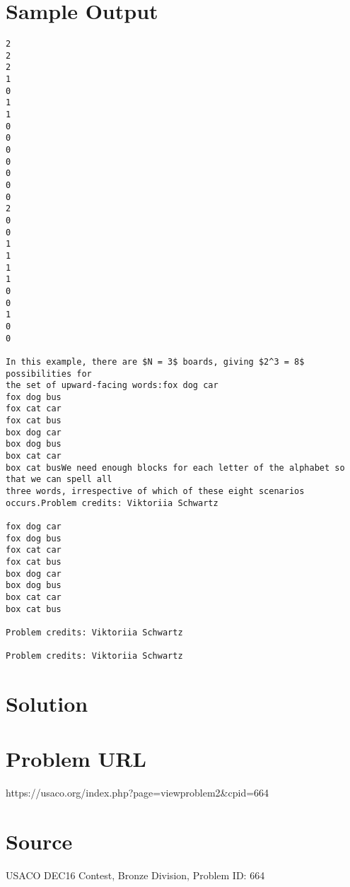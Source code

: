 \documentclass[12pt]{article}
\begin{document}
\section*{Sample Output}
\begin{verbatim}
2
2
2
1
0
1
1
0
0
0
0
0
0
0
2
0
0
1
1
1
1
0
0
1
0
0

In this example, there are $N = 3$ boards, giving $2^3 = 8$ possibilities for
the set of upward-facing words:fox dog car
fox dog bus
fox cat car
fox cat bus
box dog car
box dog bus
box cat car
box cat busWe need enough blocks for each letter of the alphabet so that we can spell all
three words, irrespective of which of these eight scenarios occurs.Problem credits: Viktoriia Schwartz

fox dog car
fox dog bus
fox cat car
fox cat bus
box dog car
box dog bus
box cat car
box cat bus

Problem credits: Viktoriia Schwartz

Problem credits: Viktoriia Schwartz
\end{verbatim}

\section*{Solution}


\section*{Problem URL}
https://usaco.org/index.php?page=viewproblem2&cpid=664

\section*{Source}
USACO DEC16 Contest, Bronze Division, Problem ID: 664
\end{document}
